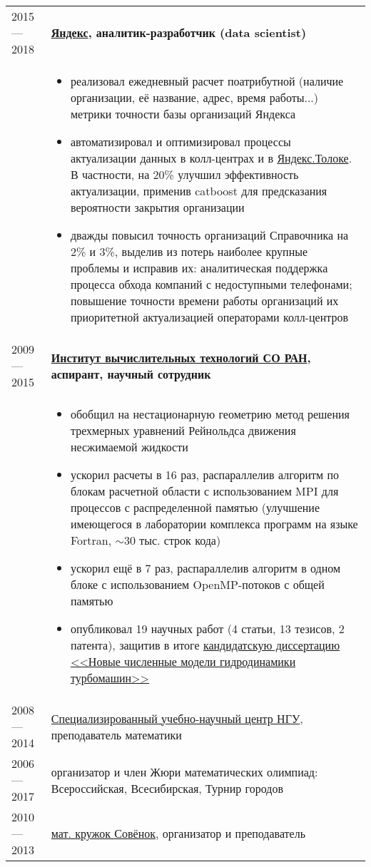 \documentclass[11pt]{article}
\begin{document}
\begin{longtable} {l | p{}}
\end{longtable}
\newpage
\begin{longtable} {l | p{}}

2015 — 2018 & {\textbf{\href{https://yandex.ru/}{Яндекс}, аналитик-разработчик (data scientist)}} \\
&
\begin{itemize}
	\vspace{-1.5em}
	\item реализовал ежедневный расчет поатрибутной (наличие организации, её название, адрес, время работы...) метрики точности базы организаций Яндекса
	\item автоматизировал и оптимизировал процессы актуализации данных в колл-центрах и в \href{https://toloka.yandex.ru}{Яндекс.Толоке}. В частности, на 20\% улучшил эффективность актуализации, применив catboost для предсказания вероятности закрытия организации
	\item дважды повысил точность организаций Справочника на 2\% и 3\%, выделив из потерь наиболее крупные проблемы и исправив их: аналитическая поддержка процесса обхода компаний с недоступными телефонами; повышение точности времени работы организаций их приоритетной актуализацией операторами колл-центров
\end{itemize}
\\

2009 — 2015 & {\textbf{\href{http://www.ict.nsc.ru}{Институт вычислительных технологий СО РАН}, аспирант, научный сотрудник}}\\
&
\begin{itemize}
	\vspace{-1.5em}
	\item обобщил на нестационарную геометрию метод решения трехмерных уравнений Рейнольдса движения несжимаемой жидкости
	\item ускорил расчеты в 16 раз, распараллелив алгоритм по блокам расчетной области с использованием MPI для процессов с распределенной памятью (улучшение имеющегося в лаборатории комплекса программ на языке Fortran, $\sim$30 тыс. строк кода)
	\item ускорил ещё в 7 раз, распараллелив алгоритм в одном блоке с использованием OpenMP-потоков с общей памятью
	\item опубликовал 19 научных работ (4 статьи, 13 тезисов, 2 патента), защитив в итоге \href{https://github.com/avalur/dissertation/blob/master/to_print/autoref_Avdyushenko.pdf}{кандидатскую диссертацию <<Новые численные модели гидродинамики турбомашин>>}
\end{itemize}
\\

2008 — 2014 & {\href{http://sesc.nsu.ru}{Специализированный учебно-научный центр НГУ}, преподаватель математики}\\
2006 — 2017 & {организатор и член Жюри математических олимпиад: Всероссийская, Всесибирская, Турнир городов}\\
2010 — 2013 & {\href{https://www.sovenok.academy/}{мат. кружок Совёнок}, организатор и преподаватель}\\

\end{longtable}
\end{document}
